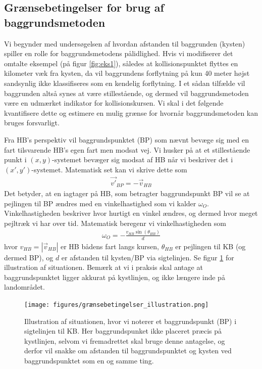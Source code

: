 \documentclass[%
 reprint,
nofootinbib,
aps,
]{revtex4-1}
\begin{document}
\subsection{Grænsebetingelser for brug af baggrundsmetoden}
Vi begynder med undersøgelsen af hvordan afstanden til baggrunden (kysten) spiller en rolle for baggrundsmetodens pålidlighed. Hvis vi modifiserer det omtalte eksempel (på figur \ref{fig:eks1}), således at kollisionspunktet flyttes en kilometer væk fra kysten, da vil baggrundens forflytning på kun 40 meter højst sandsynlig ikke klassifiseres som en kendelig forflytning. I et sådan tilfælde vil baggrunden altså synes at være stillestående, og dermed vil baggrundsmetoden være en udmærket indikator for kollisionskursen. Vi skal i det følgende kvantifisere dette og estimere en mulig grænse for hvornår baggrundsmetoden kan bruges forsvarligt. \par
Fra HB's perspektiv vil baggrundspunktet (BP) som nævnt bevæge sig med en fart tilsvarende HB's egen fart men modsat vej. Vi husker på at et stillestående punkt i $(x,y)$-systemet bevæger sig modsat af HB når vi beskriver det i $(x',y')$-systemet. Matematisk set kan vi skrive dette som
\begin{align*}
  \vec{v'}_{BP} = - \vec{v}_{HB}
\end{align*}
Det betyder, at en iagtager på HB, som betragter baggrundspunkt BP vil se at pejlingen til BP ændres med en vinkelhastighed som vi kalder $\omega_O$. Vinkelhastigheden beskriver hvor hurtigt en vinkel ændres, og dermed hvor meget pejltræk vi har over tid. Matematisk beregenr vi vinkelhastigheden som
\begin{align*}
 \omega_O = -\frac{v_{HB}\sin{(\theta_{HB})}}{d}
\end{align*}
hvor $v_{HB} = |\vec{v}_{HB}|$ er HB bådens fart langs kursen, $\theta_{HB}$ er pejlingen til KB (og dermed BP), og $d$ er afstanden til kysten/BP via sigtelinjen. Se figur \ref{fig:grænsebetingelser_illustration} for illustration af situationen. Bemærk at vi i praksis skal antage at baggrundspunktet ligger akkurat på kystlinjen, og ikke længere inde på landområdet.

\begin{figure}[H]
  \texttt{[image: figures/grænsebetingelser\_illustration.png]}
  \caption{Illustration af situationen, hvor vi noterer et baggrundspunkt (BP) i sigtelinjen til KB. Her baggrundspunket ikke placeret præcis på kystlinjen, selvom vi fremadrettet skal bruge denne antagelse, og derfor vil snakke om afstanden til baggrundspunktet og kysten ved baggrundspunktet som en og samme ting.}
  \label{fig:grænsebetingelser_illustration}
\end{figure}
\end{document}
